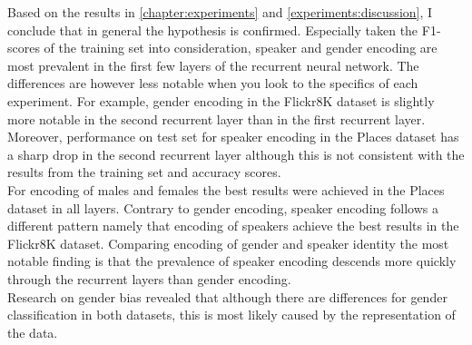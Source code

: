\documentclass[a4paper, oneside]{book}
\begin{document}
Based on the results in \autoref{chapter:experiments} and \autoref{experiments:discussion}, I conclude that in general the hypothesis is confirmed. Especially taken the F1-scores of the training set into consideration, speaker and gender encoding are most prevalent in the first few layers of the recurrent neural network. The differences are however less notable when you look to the specifics of each experiment. For example, gender encoding in the Flickr8K dataset is slightly more notable in the second recurrent layer than in the first recurrent layer. Moreover, performance on test set for speaker encoding in the Places dataset has a sharp drop in the second recurrent layer although this is not consistent with the results from the training set and accuracy scores. \\

For encoding of males and females the best results were achieved in the Places dataset in all layers. Contrary to gender encoding, speaker encoding follows a different pattern namely that encoding of speakers achieve the best results in the Flickr8K dataset. Comparing encoding of gender and speaker identity the most notable finding is that the prevalence of speaker encoding descends more quickly through the recurrent layers than gender encoding. \\

Research on gender bias revealed that although there are differences for gender classification in both datasets, this is most likely caused by the representation of the data.



\end{document}
